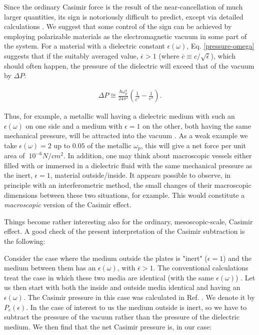 \documentclass[prl,nofootinbib,twocolumn,showpacs]{revtex4}
\def\bq{\begin{eqnarray}}
\def\ee{\end{eqnarray}}
\begin{document}
Since the  ordinary Casimir force is the result of the  near-cancellation of much larger
quantities, its sign is notoriously difficult to predict, except via detailed
calculations \cite{Boyer}. We suggest that some control of the sign can be achieved \cite{remark} by
employing polarizable materials as the electromagnetic vacuum in some part of the system.
For a material with a dielectric constant $\epsilon(\omega)$, Eq. \ref{pressure-omega}
suggests that if the suitably averaged value, $\overline{\epsilon} > 1$ (where
$\overline{c} \equiv c/\sqrt{\overline{\epsilon}}$), which should often happen, the
pressure of the dielectric will exceed that of the vacuum by $\Delta P $:

\bq \Delta P \cong  \frac{\hbar \omega_p^4}{24\pi^2} (\frac{1}{\overline{c}^3} - \frac{1}{c^3}).
\label{diff}\ee

Thus, for example, a metallic wall having a dielectric medium with such an
$\epsilon(\omega)$ on one side and a medium with $\epsilon = 1$ on the other, both having
the same mechanical pressure,  will be attracted into the vacuum \cite{el}. As a weak
example we take $\epsilon(\omega) =2$ up to $0.05$ of the metallic $\omega_p$, this will
give a net force per unit area of $~10^{-6} N/cm^2$. In addition, one may think about
macroscopic vessels either filled with or immersed in a dielectric fluid with the same
mechanical pressure as the inert, $\epsilon = 1$, material outside/inside. It appears
possible to observe, in principle with an interferometric method,  the small changes of
their macroscopic dimensions between these two situations, for example. This would
constitute a {\em macroscopic} version of the Casimir effect.

Things become rather interesting also for the ordinary, mesoscopic-scale, Casimir effect.
A good check of the present interpretation of the Casimir subtraction is the following:

Consider the case where the medium outside the plates is "inert" ($\epsilon = 1$) and the
medium between them has an $\epsilon(\omega)$, with $\overline{\epsilon} > 1$. The
conventional calculations treat the case in which these two media are identical (with the
same $\epsilon(\omega)$) . Let us then start with both the inside and outside media
identical and having an $\epsilon(\omega)$. The Casimir pressure in this case was
calculated in Ref. \cite{Dzy}. We denote it by $P_c(\epsilon)$. In the case of interest
to us the medium outside is inert, so we have to subtract the pressure of the vacuun
rather than the pressure of the dielectric medium. We then find that the net Casimir
pressure is, in our case:
\end{document}
